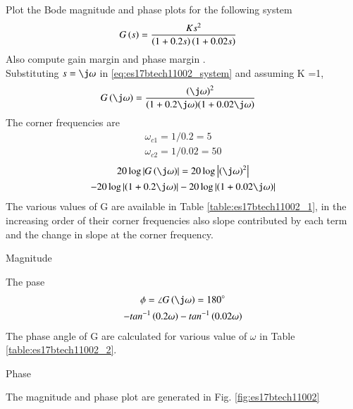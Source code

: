 \item Plot the Bode magnitude and phase plots for the following system
\begin{align}
G\left(s\right) &= \frac{Ks^2}{{\left(1+0.2s\right){\left(1+0.02s\right)}}}
\label{eq:es17btech11002_system}
\end{align}
Also compute gain margin and phase margin .
\\
\solution Substituting $s=\j\omega$ in   \eqref{eq:es17btech11002_system} and 
assuming K =1,
\begin{align}
\label{eq:es17btech11002_gain}
G\brak{\j\omega}&=\frac{\brak{\j\omega}^2}{{\brak{1+0.2\j\omega}}{\brak{1+0.02\j\omega}}}
\end{align}
The corner frequencies are
\begin{align}
\omega_{c1}=1/0.2 = 5
\\
\omega_{c2}=1/0.02 = 50
\end{align}
\begin{multline}
20\log\abs{G\brak{\j\omega}} = 20\log\abs{\brak{\j\omega}^2}\\-20\log\abs{\brak{1+0.2\j\omega}} -20\log\abs{\brak{1+0.02\j\omega}}
\end{multline}
The various values of G\brak{\j\omega} are available in Table  \ref{table:es17btech11002_1}, in the increasing order of their corner frequencies also slope contributed by each term and the change in slope at the corner frequency.
\begin{table}[!ht]
\centering

\caption{Magnitude}
\label{table:es17btech11002_1}
\end{table}
The pase
\begin{multline}
\phi = \angle{G\brak{\j\omega}}= 180\degree
\\-tan^{-1}\brak{0.2\omega}-tan^{-1}\brak{0.02\omega}
\end{multline}
The phase angle of G\brak{\j\omega} are calculated for various value of $\omega$ in Table \ref{table:es17btech11002_2}.
\begin{table}[!ht]
\centering

\caption{Phase}
\label{table:es17btech11002_2}
\end{table}
The magnitude and phase plot are generated in Fig. \ref{fig:es17btech11002}

